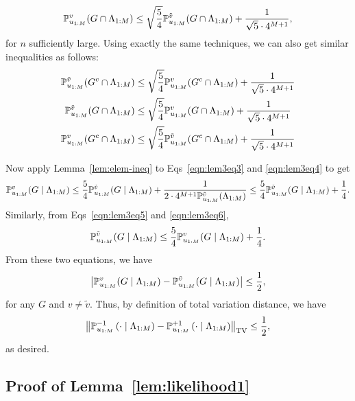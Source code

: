 \begin{equation}
\label{eqn:lem3eq3}
\mathbb{P}_{u_{1:M}}^v ( G \cap \Lambda_{1:{M}} )
\leq \sqrt{\frac{5}{4}} \mathbb{P}_{u_{1:M}}^{\tilde v} ( G \cap \Lambda_{1:{M}} ) + \frac{1}{\sqrt{5} \cdot 4^{M+1}},
\end{equation}
for $n$ sufficiently large. Using exactly the same techniques, we can also get similar inequalities as follows:
\begin{align}
	\label{eqn:lem3eq4}
	\mathbb{P}_{u_{1:M}}^{\tilde v} (G^c \cap \Lambda_{1:{M}}) &\leq \sqrt{\frac{5}{4}} \mathbb{P}_{u_{1:M}}^v ( G^c \cap \Lambda_{1:{M}} ) + \frac{1}{\sqrt 5 \cdot 4^{M+1}}\\
	\label{eqn:lem3eq5}
	\mathbb{P}_{u_{1:M}}^{\tilde v} (G \cap \Lambda_{1:{M}}) &\leq \sqrt{\frac{5}{4}} \mathbb{P}_{u_{1:M}}^v ( G \cap \Lambda_{1:{M}} ) + \frac{1}{\sqrt 5 \cdot 4^{M+1}}\\
	\label{eqn:lem3eq6}
	\mathbb{P}_{u_{1:M}}^v (G^c \cap \Lambda_{1:{M}}) &\leq \sqrt{\frac{5}{4}} \mathbb{P}_{u_{1:M}}^{\tilde v} ( G^c \cap \Lambda_{1:{M}} ) + \frac{1}{\sqrt 5 \cdot 4^{M+1}}
\end{align}


Now apply Lemma~\ref{lem:elem-ineq} to Eqs~\eqref{eqn:lem3eq3} and \eqref{eqn:lem3eq4} to get
\begin{equation*}
	\mathbb{P}_{u_{1:M}}^v (G \mid \Lambda_{1:{M}}) 
	\leq \frac{5}{4} \mathbb{P}_{u_{1:M}}^{\tilde{v}}(G \mid \Lambda_{1:{M}}) + \frac{1}{2\cdot 4^{M+1} \mathbb{P}_{u_{1:M}}^{\tilde{v}}(\Lambda_{1:{M}})} 
	\leq \frac{5}{4} \mathbb{P}_{u_{1:M}}^{\tilde{v}}(G \mid \Lambda_{1:{M}}) + \frac{1}{4}.
\end{equation*}
Similarly, from Eqs~\eqref{eqn:lem3eq5} and \eqref{eqn:lem3eq6},
\begin{equation*}
	\mathbb{P}_{u_{1:M}}^{\tilde{v}} (G \mid \Lambda_{1:{M}}) 
	\leq \frac{5}{4} \mathbb{P}_{u_{1:M}}^v(G \mid \Lambda_{1:{M}}) + \frac{1}{4}.
\end{equation*}
From these two equations, we have
\begin{equation*}
	\left|\mathbb{P}_{u_{1:M}}^v (G \mid \Lambda_{1:{M}})- \mathbb{P}_{u_{1:M}}^{\tilde{v}} (G \mid \Lambda_{1:{M}})\right| \leq \frac{1}{2},
\end{equation*}
for any $G$ and $v \neq \tilde v$. Thus, by definition of total variation distance, we have 
\begin{equation*}
	\tvnorm{ \probuvm \left (\cdot \mid \EvSmSplFrmOneTo{M} \right ) -
		\probuvp \left (\cdot \mid \EvSmSplFrmOneTo{M} \right ) } \leq \frac{1}{2},
\end{equation*}
as desired.

\subsection{Proof of Lemma~\ref{lem:likelihood1}}
\label{sec:proof-likelihood1}

